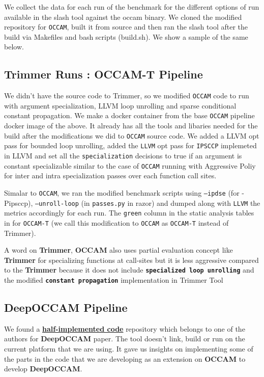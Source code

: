 \documentclass{relatorio}
\begin{document}
We collect the data for each run of the benchmark for the different options of run available in the slash tool against the occam binary. We cloned the modified repository for \texttt{OCCAM}, built it from source and then ran the slash tool after the build via Makefiles and bash scripts (build.sh). We show a sample of the same below. 

\subsection{Trimmer Runs : OCCAM-T Pipeline}%
\label{Tools}

We didn't have the source code to Trimmer, so we modified \texttt{OCCAM} code to run with argument specialization, LLVM loop unrolling and sparse conditional constant propagation. 
We make a docker container from the base \texttt{OCCAM} pipeline docker image of the above. It already has all the tools and libaries needed for the build after the modifications we did to \texttt{OCCAM} source code. We added a LLVM opt pass for bounded loop unrolling, added the \texttt{LLVM} opt pass for \texttt{IPSCCP} implemeted in LLVM and set all the \texttt{specialization} decisions to true if an argument is constant specializable similar to the case of \texttt{OCCAM} running with Aggressive Poliy for inter and intra specialization passes over each function call sites. 

Simalar to \texttt{OCCAM}, we ran the modified benchmark scripts using \texttt{--ipdse} (for -Pipsccp), \texttt{--unroll-loop} (in \texttt{passes.py} in razor) and dumped along with \texttt{LLVM} the metrics accordingly for each run. The \texttt{green} column in the static analysis tables in for \texttt{OCCAM-T} (we call this modification to \texttt{OCCAM} as \texttt{OCCAM-T} instead of Trimmer).

A word on \textbf{Trimmer}, \textbf{OCCAM} also uses partial evaluation concept like \textbf{Trimmer} for specializing functions at call-sites but it is less aggressive compared to the  \textbf{Trimmer} because it does not include \textbf{\texttt{specialized loop unrolling}} and the modified \textbf{\texttt{constant propagation}} implementation in Trimmer Tool

\subsection{DeepOCCAM Pipeline}%
\label{Tools}

We found a \textbf{\href{https://github.com/nhamlv-55/OCCAM/tree/mlpolicy}{half-implemented code}} repository which belongs to one of the authors for \textbf{DeepOCCAM} paper. The tool doesn't link, build or run on the current platform that we are using. It gave us insights on implementing some of the parts in the code that we are developing as an extension on \textbf{OCCAM} to develop \textbf{DeepOCCAM}.
\end{document}

